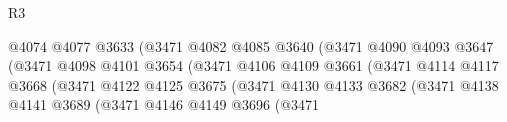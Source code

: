 \begin{lexlean}{R3}
\begin{coremodule}
                                                  @4074
                                                  @4077
                                                  @3633
                                                  (@3471
                                                    @4082
                                                    @4085
                                                    @3640
                                                    (@3471
                                                      @4090
                                                      @4093
                                                      @3647
                                                      (@3471
                                                        @4098
                                                        @4101
                                                        @3654
                                                        (@3471
                                                          @4106
                                                          @4109
                                                          @3661
                                                          (@3471
                                                            @4114
                                                            @4117
                                                            @3668
                                                            (@3471
                                                              @4122
                                                              @4125
                                                              @3675
                                                              (@3471
                                                                @4130
                                                                @4133
                                                                @3682
                                                                (@3471
                                                                  @4138
                                                                  @4141
                                                                  @3689
                                                                  (@3471
                                                                    @4146
                                                                    @4149
                                                                    @3696
                                                                    (@3471

\end{coremodule}
\end{lexlean}
